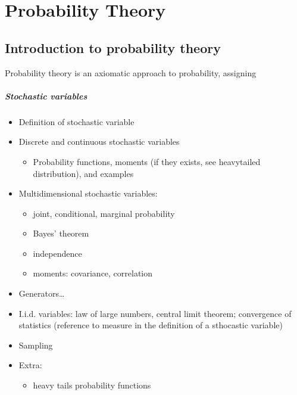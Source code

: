 \documentclass[letterpaper,10pt,english]{jupyterBook}
\begin{document}
\part{Probability Theory}

\sphinxstepscope


\chapter{Introduction to probability theory}
\label{\detokenize{ch/prob/intro:introduction-to-probability-theory}}\label{\detokenize{ch/prob/intro:prob}}\label{\detokenize{ch/prob/intro::doc}}
\sphinxAtStartPar
Probability theory is an axiomatic approach to probability, assigning
\subsubsection*{Stochastic variables}
\begin{itemize}
\item {} 
\sphinxAtStartPar
Definition of stochastic variable

\item {} 
\sphinxAtStartPar
Discrete and continuous stochastic variables
\begin{itemize}
\item {} 
\sphinxAtStartPar
Probability functions, moments (if they exists, see heavy\sphinxhyphen{}tailed distribution), and examples

\end{itemize}

\item {} 
\sphinxAtStartPar
Multi\sphinxhyphen{}dimensional stochastic variables:
\begin{itemize}
\item {} 
\sphinxAtStartPar
joint, conditional, marginal probability

\item {} 
\sphinxAtStartPar
Bayes’ theorem

\item {} 
\sphinxAtStartPar
independence

\item {} 
\sphinxAtStartPar
moments: covariance, correlation

\end{itemize}

\item {} 
\sphinxAtStartPar
Generators…

\item {} 
\sphinxAtStartPar
I.i.d. variables: law of large numbers, central limit theorem; convergence of statistics (reference to measure in the definition of a sthocastic variable)

\item {} 
\sphinxAtStartPar
Sampling

\item {} 
\sphinxAtStartPar
Extra:
\begin{itemize}
\item {} 
\sphinxAtStartPar
heavy tails probability functions

\end{itemize}

\end{itemize}
\end{document}
